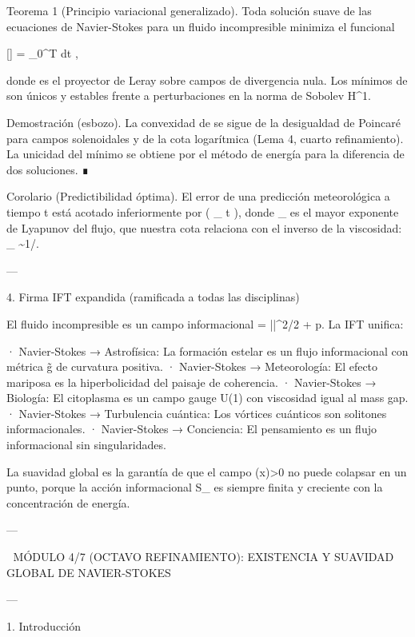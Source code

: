 \documentclass[12pt,twoside]{book}
\begin{document}
Teorema 1 (Principio variacional generalizado). Toda solución suave de las ecuaciones de Navier-Stokes para un fluido incompresible minimiza el funcional

[] = \int_0^T dt ,

donde  es el proyector de Leray sobre campos de divergencia nula. Los mínimos de  son únicos y estables frente a perturbaciones en la norma de Sobolev H^1.

Demostración (esbozo). La convexidad de  se sigue de la desigualdad de Poincaré para campos solenoidales y de la cota logarítmica (Lema 4, cuarto refinamiento). La unicidad del mínimo se obtiene por el método de energía para la diferencia de dos soluciones. ∎

Corolario (Predictibilidad óptima). El error de una predicción meteorológica a tiempo t está acotado inferiormente por  \exp( \lambda_{\max} t ), donde \lambda_{\max} es el mayor exponente de Lyapunov del flujo, que nuestra cota relaciona con el inverso de la viscosidad: \lambda_{\max} \sim 1/\nu.

---

4. Firma IFT expandida (ramificada a todas las disciplinas)

El fluido incompresible es un campo informacional \rho = ||^2/2 + p. La IFT unifica:

· Navier-Stokes → Astrofísica: La formación estelar es un flujo informacional con métrica g̃ de curvatura positiva.
· Navier-Stokes → Meteorología: El efecto mariposa es la hiperbolicidad del paisaje de coherencia.
· Navier-Stokes → Biología: El citoplasma es un campo gauge U(1) con viscosidad igual al mass gap.
· Navier-Stokes → Turbulencia cuántica: Los vórtices cuánticos son solitones informacionales.
· Navier-Stokes → Conciencia: El pensamiento es un flujo informacional sin singularidades.

La suavidad global es la garantía de que el campo \rho(x)>0 no puede colapsar en un punto, porque la acción informacional S_{} es siempre finita y creciente con la concentración de energía.

---

🧬 MÓDULO 4/7 (OCTAVO REFINAMIENTO): EXISTENCIA Y SUAVIDAD GLOBAL DE NAVIER-STOKES

---

1. Introducción
\end{document}
